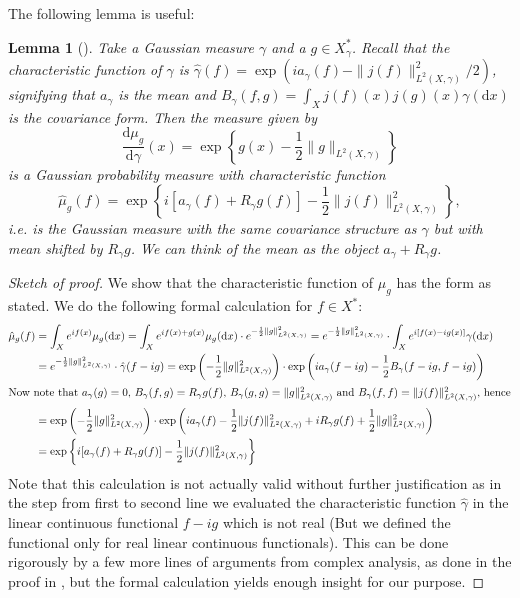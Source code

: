 \documentclass{scrartcl}
\newtheorem{lemma}{Lemma}
\theoremstyle{definition}
\theoremstyle{remark}
\newcommand{\de}{\mathrm d}
\begin{document}
The following lemma is useful:
\begin{lemma}[{\cite[Lemma 3.1.4]{Lunardi}}]\label{lem:prelim_CM}
Take a Gaussian measure $\gamma$ and a $g\in X_\gamma^*$. Recall that the characteristic function of $\gamma$ is $\hat \gamma(f) = \exp(ia_\gamma(f) - \|j(f)\|_{L^2(X, \gamma)}^2/2)$, signifying that $a_\gamma$ is the mean and $B_\gamma(f, g) = \int_X j(f)(x)j(g)(x)\gamma(\de x)$ is the covariance form. Then the measure given by
\[\frac{\de\mu_g}{\de \gamma}(x) = \exp\left\{g(x)-\frac{1}{2}\|g\|_{L^2(X,\gamma)}\right\}\]
is a Gaussian probability measure with characteristic function
\[\hat\mu_g(f) = \exp\left\{i[a_\gamma(f) + R_\gamma g(f)]-\frac{1}{2}\|j(f)\|_{L^2(X,\gamma)}^2\right\},\]
i.e. is the Gaussian measure with the same covariance structure as $\gamma$ but with mean shifted by $R_\gamma g$. We can think of the mean as the object $a_\gamma + R_\gamma g$.
\end{lemma}
\begin{proof}[Sketch of proof]
We show that the characteristic function of $\mu_g$ has the form as stated. We do the following formal calculation for $f\in X^*$:
\begin{align*}
\hat \mu_g(f) &= \int_X e^{if(x)}\mu_g(\de x) = \int_X e^{if(x)+g(x)} \mu_g(\de x) \cdot e^{-\frac{1}{2}\|g\|_{L^2(X,\gamma)}^2} = e^{-\frac{1}{2}\|g\|_{L^2(X,\gamma)}^2} \cdot \int_X e^{i[f(x)-ig(x)]}\gamma(\de x) \\
&= e^{-\frac{1}{2}\|g\|_{L^2(X,\gamma)}^2} \cdot \hat \gamma(f-ig) = \exp\left({-\frac{1}{2}\|g\|_{L^2(X,\gamma)}^2}\right) \cdot \exp \left(i a_\gamma(f-ig)-\frac{1}{2}B_\gamma(f-ig,f-ig)\right)\\
\intertext{Now note that $a_\gamma(g) = 0$, $B_\gamma(f,g) = R_\gamma g(f)$, $B_\gamma(g,g) = \|g\|_{L^2(X,\gamma)}^2$ and $B_\gamma(f,f) = \|j(f)\|_{L^2(X,\gamma)}^2$, hence}
&= \exp\left({-\frac{1}{2}\|g\|_{L^2(X,\gamma)}^2}\right) \cdot \exp \left(i a_\gamma(f)-\frac{1}{2}\|j(f)\|_{L^2(X,\gamma)}^2 + iR_\gamma g(f) + \frac{1}{2}\|g\|_{L^2(X,\gamma)}^2\right)\\
&= \exp\left\{i[a_\gamma(f) + R_\gamma g(f)]-\frac{1}{2}\|j(f)\|_{L^2(X,\gamma)}^2\right\}
\end{align*}
Note that this calculation is not actually valid without further justification as in the step from first to second line we evaluated the characteristic function $\hat \gamma$ in the linear continuous functional $f-ig$ which is not real (But we defined the functional only for real linear continuous functionals). This can be done rigorously by a few more lines of arguments from complex analysis, as done in the proof in \cite{Lunardi}, but the formal calculation yields enough insight for our purpose. 
\end{proof}
\end{document}
